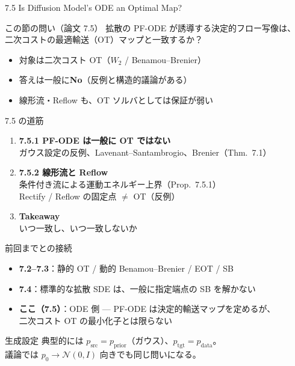 

\begin{frame}{7.5 Is Diffusion Model's ODE an Optimal Map?}
    \begin{block}{この節の問い（論文 7.5）}
        拡散の PF-ODE が誘導する決定的フロー写像は、\\
        二次コストの最適輸送（OT）マップと一致するか？
    \end{block}
    \begin{itemize}
        \item 対象は二次コスト OT（$W_2$ / Benamou--Brenier）
        \item 答えは一般に\textbf{No}（反例と構造的議論がある）
        \item 線形流・Reflow も、OT ソルバとしては保証が弱い
    \end{itemize}
\end{frame}
\asmain
\begin{frame}{7.5 の道筋}
    \begin{enumerate}
        \item \textbf{7.5.1 PF-ODE は一般に OT ではない}\\
        ガウス設定の反例、Lavenant--Santambrogio、Brenier（Thm.\ 7.1）
        \item \textbf{7.5.2 線形流と Reflow}\\
        条件付き流による運動エネルギー上界（Prop.\ 7.5.1）\\
        Rectify / Reflow の固定点 $\neq$ OT（反例）
        \item \textbf{Takeaway}\\
        いつ一致し、いつ一致しないか
    \end{enumerate}
\end{frame}
\asmain
\begin{frame}{前回までとの接続}
    \begin{itemize}
        \item \textbf{7.2--7.3}：静的 OT / 動的 Benamou--Brenier / EOT / SB
        \item \textbf{7.4}：標準的な拡散 SDE は、一般に指定端点の SB を解かない
        \item \textbf{ここ（7.5）}：ODE 側 --- PF-ODE は決定的輸送マップを定めるが、\\
        二次コスト OT の最小化子とは限らない
    \end{itemize}
    \begin{exampleblock}{生成設定}
        典型的には $p_{\mathrm{src}}=p_{\mathrm{prior}}$（ガウス）、$p_{\mathrm{tgt}}=p_{\mathrm{data}}$。\\
        議論では $p_0\to\mathcal{N}(0,I)$ 向きでも同じ問いになる。
    \end{exampleblock}
\end{frame}
